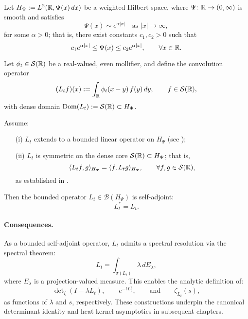 \begin{proposition}
\label{prop:selfadjointness_Lt}
Let \( H_\Psi := L^2(\mathbb{R}, \Psi(x)\, dx) \) be a weighted Hilbert space, where \( \Psi \colon \mathbb{R} \to (0,\infty) \) is smooth and satisfies
\[
\Psi(x) \sim e^{\alpha|x|} \quad \text{as } |x| \to \infty,
\]
for some \( \alpha > 0 \); that is, there exist constants \( c_1, c_2 > 0 \) such that
\[
c_1 e^{\alpha |x|} \le \Psi(x) \le c_2 e^{\alpha |x|}, \qquad \forall x \in \mathbb{R}.
\]

Let \( \phi_t \in \mathcal{S}(\mathbb{R}) \) be a real-valued, even mollifier, and define the convolution operator
\[
(L_t f)(x) := \int_{\mathbb{R}} \phi_t(x - y)\, f(y)\, dy, \qquad f \in \mathcal{S}(\mathbb{R}),
\]
with dense domain \( \operatorname{Dom}(L_t) := \mathcal{S}(\mathbb{R}) \subset H_\Psi \).

Assume:
\begin{itemize}
    \item[\textup{(i)}] \( L_t \) extends to a bounded linear operator on \( H_\Psi \) (see );
    \item[\textup{(ii)}] \( L_t \) is symmetric on the dense core \( \mathcal{S}(\mathbb{R}) \subset H_\Psi \); that is,
    \[
    \langle L_t f, g \rangle_{H_\Psi} = \langle f, L_t g \rangle_{H_\Psi}, \qquad \forall f, g \in \mathcal{S}(\mathbb{R}),
    \]
    as established in .
\end{itemize}

Then the bounded operator \( L_t \in \mathcal{B}(H_\Psi) \) is self-adjoint:
\[
L_t^* = L_t.
\]

\paragraph{Consequences.}
As a bounded self-adjoint operator, \( L_t \) admits a spectral resolution via the spectral theorem:
\[
L_t = \int_{\sigma(L_t)} \lambda\, dE_\lambda,
\]
where \( E_\lambda \) is a projection-valued measure. This enables the analytic definition of:
\[
\det\nolimits_\zeta(I - \lambda L_t), \qquad e^{-t L_t^2}, \qquad \text{and} \qquad \zeta_{L_t}(s),
\]
as functions of \( \lambda \) and \( s \), respectively. These constructions underpin the canonical determinant identity and heat kernel asymptotics in subsequent chapters.
\end{proposition}
